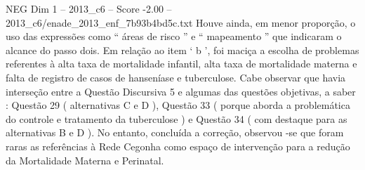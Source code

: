 \begin{textsample}{NEG Dim 1 – 2013\_c6 – Score -2.00 – 2013\_c6/enade\_2013\_enf\_7b93b4bd5c.txt}
Houve ainda, em menor proporção, o uso das expressões como “ áreas de risco ” e “ mapeamento ” que indicaram o alcance do passo dois.
Em relação ao item ‘ b ’, foi maciça a escolha de problemas referentes à alta taxa de mortalidade infantil, alta taxa de mortalidade materna e falta de registro de casos de hanseníase e tuberculose.
Cabe observar que havia interseção entre a Questão Discursiva 5 e algumas das questões objetivas, a saber : Questão 29 ( alternativas C e D ), Questão 33 ( porque aborda a problemática do controle e tratamento da tuberculose ) e Questão 34 ( com destaque para as alternativas B e D ).
No entanto, concluída a correção, observou -se que foram raras as referências à Rede Cegonha como espaço de intervenção para a redução da Mortalidade Materna e Perinatal.

\end{textsample}
